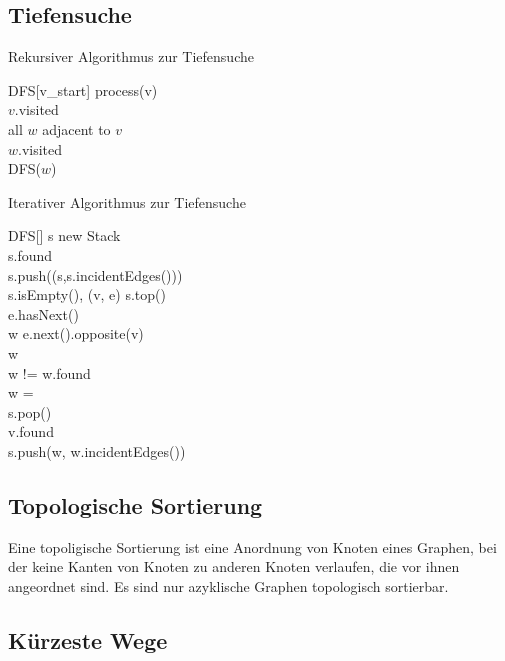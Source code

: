 \subsection{Tiefensuche}
\label{subsec:Tiefensuche}

Rekursiver Algorithmus zur Tiefensuche

\begin{algorithm}{DFS}[v_{start}]{
	\qoutput{}
}
process(v)\\
$v$.visited \qlet \qtrue\\
\qfor all $w$ adjacent to $v$\\
	\qif \qnot $w$.visited\\
		\qthen DFS($w$) \qfi
\qrof
\end{algorithm}

Iterativer Algorithmus zur Tiefensuche

\begin{algorithm}{DFS}[]{
	\qinput{}
	\qoutput{}
}
s \qlet new Stack\\
s.found \qlet \qtrue\\
s.push((s,s.incidentEdges()))\\
\qwhile \qnot s.isEmpty(), (v, e) \qlet s.top()\\
        \qif e.hasNext()\\
		\qthen w \qlet e.next().opposite(v)\\
		\qelse w \qlet \qnil
	\qfi\\
	\qwhile w != \qnil \qand w.found\\
		\qif w = \qnil\\
			\qthen s.pop()\\
			\qelse
				v.found \qlet \qtrue\\
				s.push(w, w.incidentEdges())
		\qfi
	\qelihw
\qelihw
\end{algorithm}

\subsection{Topologische Sortierung}
\label{subsec:TopologischeSortierung}

Eine topoligische Sortierung ist eine Anordnung von Knoten eines Graphen,
bei der keine Kanten von Knoten zu anderen Knoten verlaufen, die vor ihnen angeordnet sind.
Es sind nur azyklische Graphen topologisch sortierbar.

\subsection{Kürzeste Wege}
\label{subsec:KuerzesteWege}

